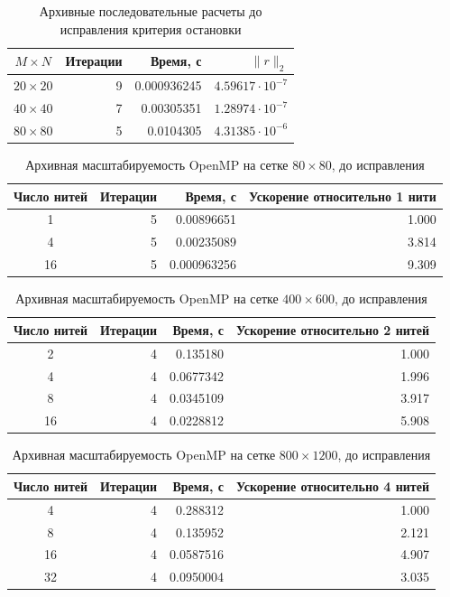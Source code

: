 \documentclass[12pt,a4paper]{article}
\begin{document}
\begin{table}[h]
\centering
\caption{Архивные последовательные расчеты до исправления критерия остановки}
\label{tab:seq}
\begin{tabular}{crrr}
\toprule
\(M\times N\) & Итерации & Время, с & \(\|r\|_2\)\\
\midrule
\(20\times20\) & 9 & 0.000936245 & \(4.59617\cdot10^{-7}\)\\
\(40\times40\) & 7 & 0.00305351 & \(1.28974\cdot10^{-7}\)\\
\(80\times80\) & 5 & 0.0104305 & \(4.31385\cdot10^{-6}\)\\
\bottomrule
\end{tabular}
\end{table}

\begin{table}[h]
\centering
\caption{Архивная масштабируемость OpenMP на сетке \(80\times80\), до исправления}
\label{tab:omp80}
\begin{tabular}{crrr}
\toprule
Число нитей & Итерации & Время, с & Ускорение относительно 1 нити\\
\midrule
1  & 5 & 0.00896651 & 1.000\\
4  & 5 & 0.00235089 & 3.814\\
16 & 5 & 0.000963256 & 9.309\\
\bottomrule
\end{tabular}
\end{table}

\begin{table}[h]
\centering
\caption{Архивная масштабируемость OpenMP на сетке \(400\times600\), до исправления}
\label{tab:omp400}
\begin{tabular}{crrr}
\toprule
Число нитей & Итерации & Время, с & Ускорение относительно 2 нитей\\
\midrule
2  & 4 & 0.135180 & 1.000\\
4  & 4 & 0.0677342 & 1.996\\
8  & 4 & 0.0345109 & 3.917\\
16 & 4 & 0.0228812 & 5.908\\
\bottomrule
\end{tabular}
\end{table}

\begin{table}[h]
\centering
\caption{Архивная масштабируемость OpenMP на сетке \(800\times1200\), до исправления}
\label{tab:omp800}
\begin{tabular}{crrr}
\toprule
Число нитей & Итерации & Время, с & Ускорение относительно 4 нитей\\
\midrule
4  & 4 & 0.288312 & 1.000\\
8  & 4 & 0.135952 & 2.121\\
16 & 4 & 0.0587516 & 4.907\\
32 & 4 & 0.0950004 & 3.035\\
\bottomrule
\end{tabular}
\end{table}
\end{document}
